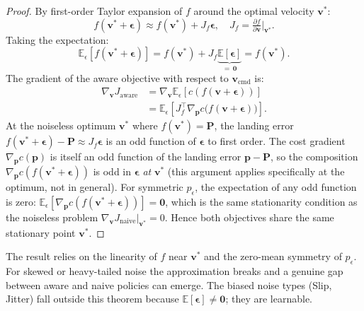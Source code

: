 \begin{proof}
By first-order Taylor expansion of $f$ around the optimal velocity $\mathbf{v}^*$:
\begin{equation*}
  f(\mathbf{v}^* + \boldsymbol{\epsilon}) \approx f(\mathbf{v}^*) + J_f \boldsymbol{\epsilon},
  \quad J_f = \tfrac{\partial f}{\partial \mathbf{v}}\big|_{\mathbf{v}^*}.
\end{equation*}
Taking the expectation:
\begin{equation*}
  \mathbb{E}_\epsilon[f(\mathbf{v}^* + \boldsymbol{\epsilon})]
  = f(\mathbf{v}^*) + J_f \underbrace{\mathbb{E}[\boldsymbol{\epsilon}]}_{=\,\mathbf{0}}
  = f(\mathbf{v}^*).
\end{equation*}
The gradient of the aware objective with respect to $\mathbf{v}_{\mathrm{cmd}}$ is:
\begin{align*}
  \nabla_{\mathbf{v}} J_{\mathrm{aware}}
  &= \nabla_{\mathbf{v}} \mathbb{E}_\epsilon[c(f(\mathbf{v} + \boldsymbol{\epsilon}))] \\
  &= \mathbb{E}_\epsilon\!\left[J_f^\top \nabla_{\mathbf{p}} c\bigl(f(\mathbf{v}
     + \boldsymbol{\epsilon})\bigr)\right].
\end{align*}
At the noiseless optimum $\mathbf{v}^*$ where $f(\mathbf{v}^*) = \mathbf{P}$, the
landing error $f(\mathbf{v}^* + \boldsymbol{\epsilon}) - \mathbf{P} \approx
J_f \boldsymbol{\epsilon}$ is an odd function of $\boldsymbol{\epsilon}$ to first order.
The cost gradient $\nabla_{\mathbf{p}} c(\mathbf{p})$ is itself an odd function of
the landing error $\mathbf{p} - \mathbf{P}$, so the composition
$\nabla_{\mathbf{p}} c(f(\mathbf{v}^* + \boldsymbol{\epsilon}))$ is odd in
$\boldsymbol{\epsilon}$ \emph{at} $\mathbf{v}^*$ (this argument applies specifically at
the optimum, not in general).
For symmetric $p_\epsilon$, the expectation of any odd function is zero:
$\mathbb{E}_\epsilon[\nabla_{\mathbf{p}} c(f(\mathbf{v}^* +
\boldsymbol{\epsilon}))] = \mathbf{0}$, which is the same stationarity condition as the
noiseless problem $\nabla_{\mathbf{v}} J_{\mathrm{naive}}\big|_{\mathbf{v}^*} = 0$.
Hence both objectives share the same stationary point $\mathbf{v}^*$.
\end{proof}

\begin{remark}
The result relies on the linearity of $f$ near $\mathbf{v}^*$ and the zero-mean
symmetry of $p_\epsilon$.
For skewed or heavy-tailed noise the approximation breaks and a genuine gap between
aware and naive policies can emerge.
The biased noise types (Slip, Jitter) fall outside this theorem because
$\mathbb{E}[\boldsymbol{\epsilon}] \neq \mathbf{0}$; they are learnable.
\end{remark}

